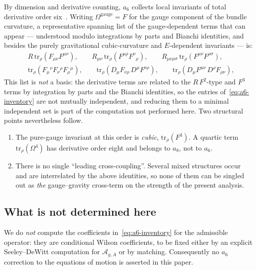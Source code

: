 \documentclass[12pt,a4paper]{article}
\theoremstyle{remark}
\begin{document}
      By dimension and derivative counting, $a_6$ collects local invariants of total derivative
      order six~\cite{Vassilevich2003,ParkerToms2009}. Writing $\Omega^{\mathrm{gauge}} = F$ for
      the gauge component of the bundle curvature, a representative spanning list of the
      gauge-dependent terms that can appear --- understood modulo integrations by parts and
      Bianchi identities, and besides the purely gravitational cubic-curvature and $E$-dependent
      invariants --- is:
      \begin{align}
        &R\,\mathrm{tr}_\rho(F_{\mu\nu}F^{\mu\nu}),
        \qquad
        R_{\mu\nu}\,\mathrm{tr}_\rho(F^{\mu\rho}F^{\nu}{}_{\rho}),
        \qquad
        R_{\mu\nu\rho\sigma}\,\mathrm{tr}_\rho(F^{\mu\nu}F^{\rho\sigma}),
        \nonumber\\[2pt]
        &\mathrm{tr}_\rho(F_{\mu}{}^{\nu}F_{\nu}{}^{\rho}F_{\rho}{}^{\mu}),
        \qquad
        \mathrm{tr}_\rho(D_\mu F_{\nu\rho}\,D^\mu F^{\nu\rho}),
        \qquad
        \mathrm{tr}_\rho(D_\mu F^{\mu\nu}\,D^\rho F_{\rho\nu}),
        \label{eq:a6-inventory}
      \end{align}
      This list is \emph{not} a basis: the derivative terms are related to the $R\,F^2$-type and
      $F^3$ terms by integration by parts and the Bianchi identities, so the entries
      of~\eqref{eq:a6-inventory} are not mutually independent, and reducing them to a minimal
      independent set is part of the computation not performed here.
      Two structural points nevertheless follow.
      \begin{enumerate}
        \item The pure-gauge invariant at this order is \emph{cubic},
        $\mathrm{tr}_\rho(F^3)$. A quartic term $\mathrm{tr}_\rho(\Omega^4)$ has derivative order
        eight and belongs to $a_8$, not to $a_6$.
        \item There is no single ``leading cross-coupling''. Several mixed structures occur and
        are interrelated by the above identities, so none of them can be singled out as
        \emph{the} gauge--gravity cross-term on the strength of the present analysis.
      \end{enumerate}

    \subsection{What is not determined here}
      \label{ssec:a6-open}

      We do \emph{not} compute the coefficients in~\eqref{eq:a6-inventory} for the admissible
      operator: they are conditional Wilson coefficients, to be fixed either by an explicit
      Seeley--DeWitt computation for $\mathcal{A}_{g,A}$ or by matching. Consequently no $a_6$
      correction to the equations of motion is asserted in this paper.
\end{document}
